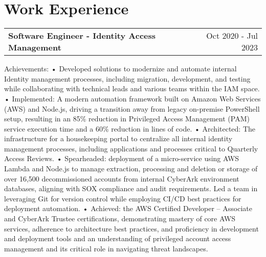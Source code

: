 \documentclass[a4paper,12pt]{article}
\makeatletter
\newenvironment{jobshort}[2]
    {
    \begin{tabularx}{\linewidth}{@{}l X r@{}}
    \textbf{#1} & \hfill &  #2 \\[3.75pt]
    \end{tabularx}
    }
    {
    }
\makeatother
\begin{document}

\section{Work Experience}

\begin{jobshort}{Software Engineer - Identity Access Management}{Oct 2020 - Jul 2023}
Achievements:
• Developed solutions to modernize and automate internal Identity management processes, including migration, development, and testing while collaborating with technical leads and various teams within the IAM space.
• Implemented: A modern automation framework built on Amazon Web Services (AWS) and Node.js, driving a transition away from legacy on-premise PowerShell setup, resulting in an 85\% reduction in Privileged Access Management (PAM) service execution time and a 60\% reduction in lines of code.
• Architected: The infrastructure for a housekeeping portal to centralize all internal identity management processes, including applications and processes critical to Quarterly Access Reviews.
• Spearheaded: deployment of a micro-service using AWS Lambda and Node.js to manage extraction, processing and deletion or storage of over 16,500 decommissioned accounts from internal CyberArk environment databases, aligning with SOX compliance and audit requirements. Led a team in leveraging Git for version control while employing CI/CD best practices for deployment automation.
• Achieved: the AWS Certified Developer – Associate and CyberArk Trustee certifications, demonstrating mastery of core AWS services, adherence to architecture best practices, and proficiency in development and deployment tools and an understanding of privileged account access management and its critical role in navigating threat landscapes.
\end{jobshort}
\end{document}
